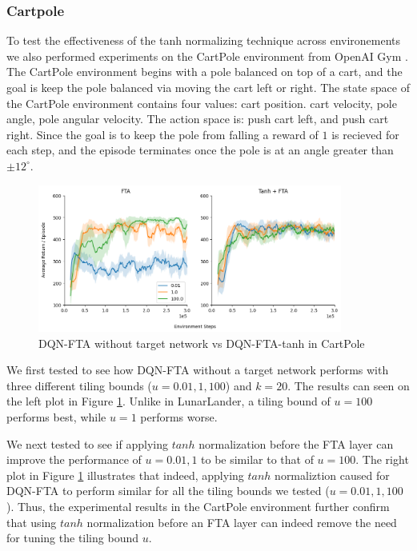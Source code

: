 \documentclass{article}
\begin{document}
\subsubsection{Cartpole}
To test the effectiveness of the tanh normalizing technique across environements we also performed experiments on the CartPole environment from OpenAI Gym \cite{brockman2016gym}.
The CartPole environment begins with a pole balanced on top of a cart, and the goal is keep the pole balanced via moving the cart left or right.
The state space of the CartPole environment contains four values: cart position. cart velocity, pole angle, pole angular velocity. 
The action space is: push cart left, and push cart right.
Since the goal is to keep the pole from falling a reward of $1$ is recieved for each step, and the episode terminates once the pole is at an angle greater than $\pm 12^\circ$.

\begin{figure}[h]
    \centering
    \includegraphics[width=10cm]{cartpole.png}
    \caption{DQN-FTA without target network vs DQN-FTA-tanh in CartPole}
    \label{fig:cartpole}
\end{figure}


We first tested to see how DQN-FTA without a target network performs with three different tiling bounds ($u=0.01, 1, 100$) and $k=20$.
The results can seen on the left plot in Figure \ref{fig:cartpole}. 
Unlike in LunarLander, a tiling bound of $u=100$ performs best, while $u=1$ performs worse.

We next tested to see if applying $tanh$ normalization before the FTA layer can improve the performance of $u=0.01, 1$ to be similar to that of $u=100$.
The right plot in Figure \ref{fig:cartpole} illustrates that indeed, applying $tanh$ normaliztion caused for DQN-FTA to perform similar for all the tiling bounds we tested ($u=0.01, 1, 100$).
Thus, the experimental results in the CartPole environment further confirm that using $tanh$ normalization before an FTA layer can indeed remove the need for tuning the tiling bound $u$.
\end{document}
